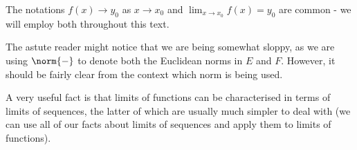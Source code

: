 The notations \( f(x)\to y_0 \) as \( x\to x_0 \) and \( \lim_{x\to x_0}f(x)=y_0 \) are common - we will employ both throughout this text.

\vspace{3mm}

The astute reader might notice that we are being somewhat sloppy, as we are using \( \norm{-} \) to denote both the Euclidean norms in \( E \) and \( F \). However, it should be fairly clear from the context which norm is being used.

\vspace{3mm}

A very useful fact is that limits of functions can be characterised in terms of limits of sequences, the latter of which are usually much simpler to deal with (we can use all of our facts about limits of sequences and apply them to limits of functions).

